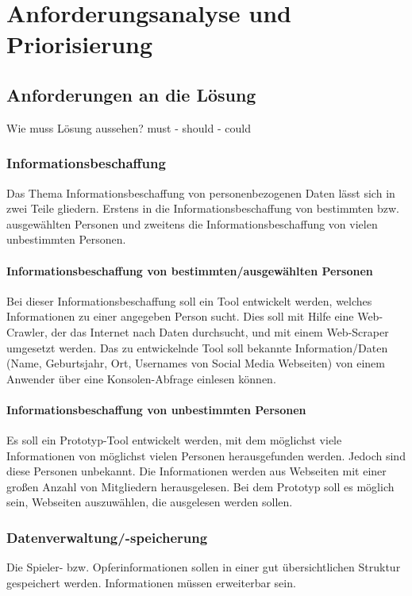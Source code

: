 
\chapter{Anforderungsanalyse und Priorisierung}  %
\label{cha:} %
\section{Anforderungen an die Lösung} %
\label{sec:} %
Wie muss Lösung aussehen? must - should - could
	
	\subsection{Informationsbeschaffung}
	Das Thema Informationsbeschaffung von personenbezogenen Daten lässt sich in zwei Teile gliedern. Erstens in die Informationsbeschaffung von bestimmten bzw. ausgewählten Personen und zweitens die Informationsbeschaffung von vielen unbestimmten Personen.
		\subsubsection{Informationsbeschaffung von bestimmten/ausgewählten Personen}
		Bei dieser Informationsbeschaffung soll ein Tool entwickelt werden, welches Informationen zu einer angegeben Person sucht. Dies soll mit Hilfe eine Web-Crawler, der das Internet nach Daten durchsucht, und mit einem Web-Scraper umgesetzt werden. Das zu entwickelnde Tool soll bekannte Information/Daten (Name, Geburtsjahr, Ort, Usernames von Social Media Webseiten) von einem Anwender über eine Konsolen-Abfrage einlesen können.
		\subsubsection{Informationsbeschaffung von unbestimmten Personen}
		Es soll ein Prototyp-Tool entwickelt werden, mit dem möglichst viele Informationen von möglichst vielen Personen herausgefunden werden. Jedoch sind diese Personen unbekannt. Die Informationen werden aus Webseiten mit einer großen Anzahl von Mitgliedern herausgelesen. Bei dem Prototyp soll es möglich sein, Webseiten auszuwählen, die ausgelesen werden sollen.
	\subsection{Datenverwaltung/-speicherung}
		Die Spieler- bzw. Opferinformationen sollen in einer gut übersichtlichen Struktur gespeichert werden. Informationen müssen erweiterbar sein.
